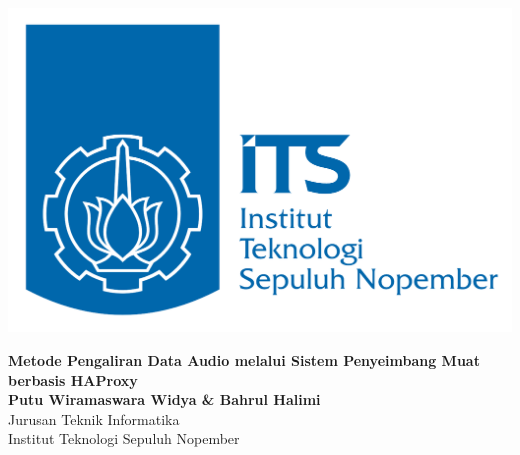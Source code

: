 \documentclass[a0,portrait]{a0poster}
\begin{document}
\begin{minipage}[b]{0.25\linewidth}
\includegraphics[width=\linewidth]{logo-its}
\end{minipage}
\begin{minipage}[b]{0.75\linewidth}

\veryHuge \color{NavyBlue} \textbf{Metode Pengaliran Data Audio melalui Sistem Penyeimbang Muat berbasis HAProxy} \\
\huge \color{black} \textbf{Putu Wiramaswara Widya \& Bahrul Halimi} \\
\Huge Jurusan Teknik Informatika \\
Institut Teknologi Sepuluh Nopember


\end{minipage}
\hline
\end{document}
